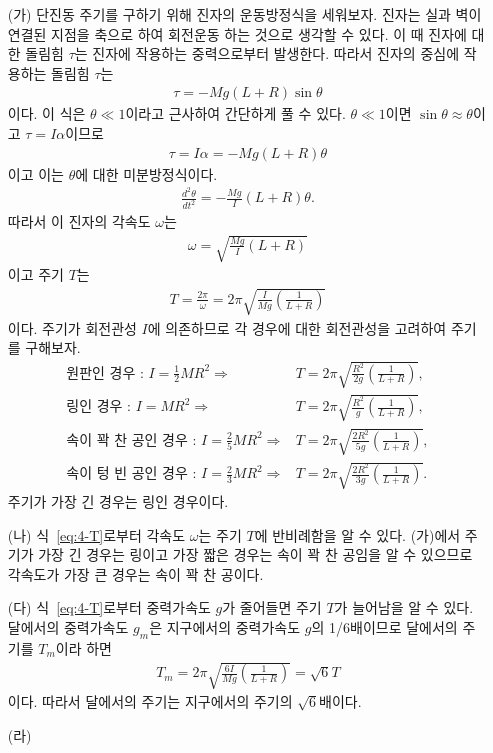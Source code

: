 \documentclass[floatfix,nofootinbib,superscriptaddress,fleqn]{revtex4-2}
\begin{document}
\begin{itemize}
  \item[(가)] 
  단진동 주기를 구하기 위해 진자의 운동방정식을 세워보자. 진자는 실과 벽이 연결된 지점을
  축으로 하여 회전운동 하는 것으로 생각할 수 있다. 이 때 진자에 대한 돌림힘 $\tau$는
  진자에 작용하는 중력으로부터 발생한다. 따라서 진자의 중심에 작용하는 돌림힘 $\tau$는
  \begin{align}\label{}
    \tau = -Mg\left(L+R\right)\sin\theta 
  \end{align}
  이다. 이 식은 $\theta\ll 1$이라고 근사하여 간단하게 풀 수 있다. $\theta\ll 1$이면
  $\sin\theta\approx\theta$이고 $\tau = I\alpha$이므로
  \begin{align}\label{}
    \tau = I\alpha = -Mg\left(L+R\right)\theta 
  \end{align}
  이고 이는 $\theta$에 대한 미분방정식이다.
  \begin{align}\label{}
    \frac{d^2\theta}{dt^2}=-\frac{Mg}{I}\left(L+R\right)\theta.
  \end{align}
  따라서 이 진자의 각속도 $\omega$는
  \begin{align}\label{}
    \omega = \sqrt{\frac{Mg}{I}\left(L+R\right)}
  \end{align}
  이고 주기 $T$는
  \begin{align}\label{eq:4-T}
    T =\frac{2\pi}{\omega}= 2\pi\sqrt{\frac{I}{Mg}\left(\frac{1}{L+R}\right)}
  \end{align}
  이다. 주기가 회전관성 $I$에 의존하므로 각 경우에 대한 회전관성을 고려하여 주기를 구해보자.
  \begin{align*}
  \text{원판인 경우 : }         
   I= \frac{1}{2}MR^2 \Longrightarrow&
   T = 2\pi\sqrt{\frac{R^2}{2g}\left(\frac{1}{L+R}\right)},\\
  \text{링인 경우 : }         
   I= MR^2  \Longrightarrow&          
  T = 2\pi\sqrt{\frac{ R^2}{g}\left(\frac{1}{L+R}\right)},\\
  \text{속이 꽉 찬 공인 경우 : }
   I= \frac{2}{5}MR^2 \Longrightarrow&
   T = 2\pi\sqrt{\frac{2R^2}{5g}\left(\frac{1}{L+R}\right)},\\
  \text{속이 텅 빈 공인 경우 : }
   I= \frac{2}{3}MR^2 \Longrightarrow&
   T = 2\pi\sqrt{\frac{2R^2 }{3g}\left(\frac{1}{L+R}\right)}.
  \end{align*}
주기가 가장 긴 경우는 링인 경우이다.
  \item[(나)] 
  식~\eqref{eq:4-T}로부터 각속도 $\omega$는 주기 $T$에 반비례함을 알 수 있다.
  (가)에서 주기가 가장 긴 경우는 링이고 가장 짧은 경우는 속이 꽉 찬 공임을 알 수 있으므로 
  각속도가 가장 큰 경우는 속이 꽉 찬 공이다.
  \item[(다)] 
  식~\eqref{eq:4-T}로부터 중력가속도 $g$가 줄어들면 주기 $T$가 늘어남을 알 수 있다.
  달에서의 중력가속도 $g_m$은 지구에서의 중력가속도 $g$의 1/6배이므로 달에서의 주기를
  $T_m$이라 하면
  \begin{align}
    T_m = 2\pi\sqrt{\frac{6I}{Mg}\left(\frac{1}{L+R}\right)}=\sqrt{6}T
  \end{align}
  이다. 따라서 달에서의 주기는 지구에서의 주기의 $\sqrt{6}$배이다.
  \item[(라)] 



\end{itemize}
\end{document}
